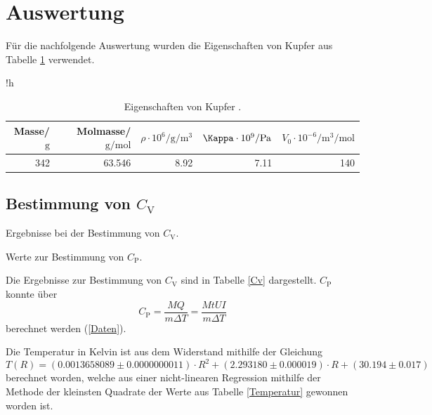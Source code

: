 \newpage
\section{Auswertung} %
\label{sec:auswertung}

Für die nachfolgende Auswertung wurden die Eigenschaften von Kupfer aus Tabelle \ref{Eigenschaften} verwendet.

\begin{table}{!h}
	\centering
	\caption[]{Eigenschaften von Kupfer \cite{kupfer1}\cite{kupfer2}.}
	\begin{tabular}{rrrrr}
		\toprule
		Masse/$\si{\gram}$ & Molmasse/$\si{\gram\per\mol}$ & $\rho \cdot 10^6/\si{\gram\per\meter^3}$ & $\Kappa \cdot 10^9/\si{\pascal}$ & $V_0 \cdot 10^{-6}/\si{\meter^3\per\mol}$\\
		\midrule
		342 & 63.546 & 8.92 & 7.11 & 140\\
		\bottomrule
	\end{tabular}
	\label{Eigenschaften}
\end{table}

\FloatBarrier
\subsection{Bestimmung von $C_\mathrm{V}$} %
\label{sub:bestimmung_von_c__mathrm}

\begin{table}[!h]
	\caption[]{Ergebnisse bei der Bestimmung von $C_\mathrm{V}$.}
	\centering
	
	\label{Cv}
\end{table}

\begin{table}[!h]
	\centering
	\caption[]{Werte zur Bestimmung von $C_\mathrm{P}$.}
	
	\label{Daten}
\end{table}

Die Ergebnisse zur Bestimmung von $C_\mathrm{V}$ sind in Tabelle \ref{Cv} dargestellt.
$C_\mathrm{P}$ konnte über
\begin{equation*}
	C_\mathrm{P} = \frac{M Q}{m \Delta T} = \frac{M t U I}{m \Delta T}
\end{equation*}
berechnet werden (\ref{Daten}).

Die Temperatur in Kelvin ist aus dem Widerstand mithilfe der Gleichung
\begin{equation*}
	T(R) = (0.0013658089 \pm 0.0000000011) \cdot R^2 + (2.293180 \pm 0.000019) \cdot R + (30.194 \pm 0.017)
\end{equation*}
berechnet worden, welche aus einer nicht-linearen Regression mithilfe der Methode der kleinsten Quadrate der Werte aus Tabelle \ref{Temperatur} gewonnen worden ist.


